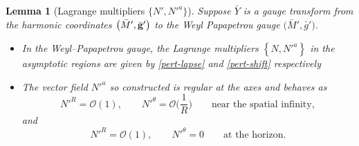 \documentclass[pdftex]{sigma}
\renewcommand{\gg}{{\bf g}}
\numberwithin{equation}{section}
\newtheorem{Lemma}[Theorem]{Lemma}
\begin{document}
 \begin{Lemma}[Lagrange multipliers $\{ N', N'^a \}$]
 	Suppose $\bar{Y}$ is a gauge transform from the harmonic coordinates $\bigl(\bar{M}', \bar{\gg}'\bigr)$ to the Weyl Papapetrou gauge $\bigl(\bar{M}', \bar{g}'\bigr)$.
 	\begin{itemize}\itemsep=0pt
 \item In the Weyl--Papapetrou gauge, the Lagrange multipliers $\left\{ N, N'^a\right\}$ in the asymptotic regions are given by \eqref{pert-lapse} and \eqref{pert-shift} respectively

\item The vector field $N'^a$ so constructed is regular at the axes and behaves as
\[
N'^R = \mathcal{O}(1), \qquad N'^\theta = \mathcal{O}\biggl(\frac{1}{R}\biggr) \qquad \text{near the spatial infinity},
\]
and
\[
N'^R = \mathcal{O}(1), \qquad N'^\theta =0 \qquad \text{at the horizon}.
\]
\end{itemize}
\end{Lemma}
\end{document}
